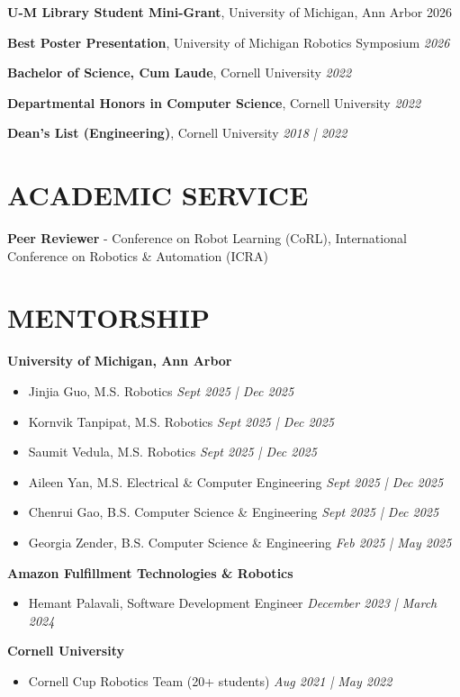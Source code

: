 \documentclass[a4paper,9pt]{extarticle}
\begin{document}
\noindent
\textbf{U-M Library Student Mini-Grant}, University of Michigan, Ann Arbor \hfill 2026

\noindent
\textbf{Best Poster Presentation}, University of Michigan Robotics Symposium \hfill \textit{2026}

\noindent
\textbf{Bachelor of Science, Cum Laude}, Cornell University \hfill \textit{2022} %

\noindent
\textbf{Departmental Honors in Computer Science}, Cornell University \hfill \textit{2022} %

\noindent 
\textbf{Dean's List (Engineering)}, Cornell University \hfill \textit{2018 | 2022} %

\section*{ACADEMIC SERVICE}
\noindent
\textbf{Peer Reviewer} - Conference on Robot Learning (CoRL), International Conference on Robotics \& Automation (ICRA)

\section*{MENTORSHIP}
\noindent
\textbf{University of Michigan, Ann Arbor}
\begin{itemize} 
    \item Jinjia Guo, M.S. Robotics  \hfill \textit{Sept 2025 | Dec 2025}
    \item Kornvik Tanpipat, M.S. Robotics  \hfill \textit{Sept 2025 | Dec 2025}
    \item Saumit Vedula, M.S. Robotics  \hfill \textit{Sept 2025 | Dec 2025}
    \item Aileen Yan, M.S. Electrical \& Computer Engineering  \hfill \textit{Sept 2025 | Dec 2025}
    \item Chenrui Gao, B.S. Computer Science \& Engineering  \hfill \textit{Sept 2025 | Dec 2025}
    \item Georgia Zender, B.S. Computer Science \& Engineering \hfill \textit{Feb 2025 | May 2025}
\end{itemize}
\noindent
\textbf{Amazon Fulfillment Technologies \& Robotics}
\begin{itemize}
    \item Hemant Palavali, Software Development Engineer \hfill \textit{December 2023 | March 2024}
\end{itemize}
\noindent
\textbf{Cornell University}
\begin{itemize}
    \item Cornell Cup Robotics Team (20+ students) \hfill \textit{Aug 2021 | May 2022}
\end{itemize}
\end{document}
